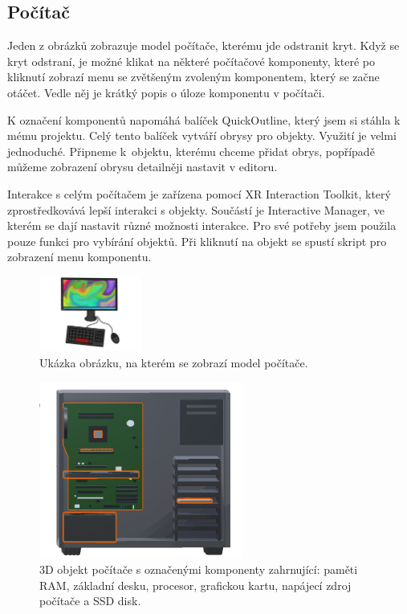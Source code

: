 \documentclass[12pt, a4paper,
twoside,        %
openright
]{report}
\begin{document}
\subsection{Počítač}	
Jeden z obrázků zobrazuje model počítače, kterému jde odstranit kryt. Když se kryt odstraní, je možné klikat na některé počítačové komponenty, které po kliknutí zobrazí menu se zvětšeným zvoleným komponentem, který se začne otáčet. Vedle něj je krátký popis o úloze komponentu v počítači.

K označení komponentů napomáhá balíček QuickOutline, který jsem si stáhla k mému projektu. Celý tento balíček vytváří obrysy pro objekty. Využití je velmi jednoduché. Připneme k~objektu, kterému chceme přidat obrys, popřípadě můžeme zobrazení obrysu detailněji nastavit v editoru. 

Interakce s celým počítačem je zařízena pomocí XR Interaction Toolkit, který zprostředkovává lepší interakci s objekty. Součástí je Interactive Manager, ve kterém se dají nastavit různé možnosti interakce. Pro své potřeby jsem použila pouze funkci pro vybírání objektů. Při kliknutí na objekt se spustí skript pro zobrazení menu komponentu.


\begin{figure}[!h]
	\centering 
	\includegraphics[width=0.3\textwidth]{image/pcImage.png} 
	\caption{Ukázka obrázku, na kterém se zobrazí model počítače.} 
	\label{fig:pc_obrazek} 
\end{figure}

\begin{figure}[H]
	\centering 
	\includegraphics[width=0.6\textwidth]{image/pc.png} 
	\caption{3D objekt počítače s označenými komponenty zahrnující: paměti RAM, základní desku, procesor, grafickou kartu, napájecí zdroj počítače a SSD disk.} 
	\label{fig:pc} 
\end{figure}
\end{document}
